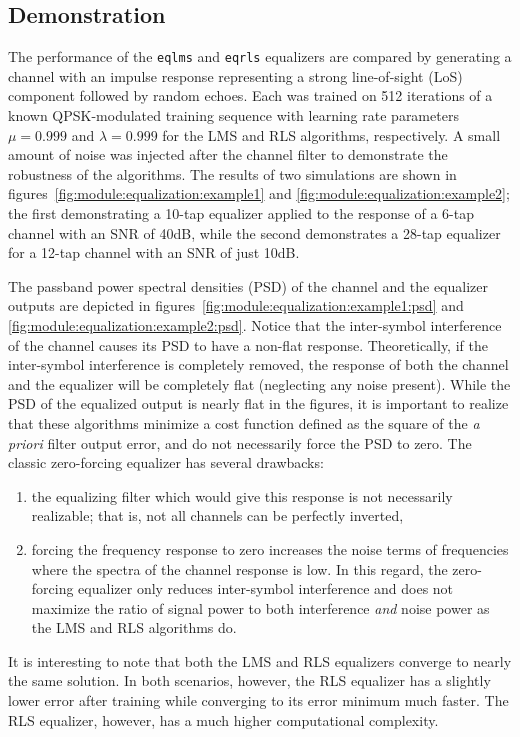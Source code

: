 \subsection{Demonstration}
\label{module:equalization:demo}
The performance of the {\tt eqlms} and {\tt eqrls} equalizers are compared by
generating a channel with an impulse response representing a strong
line-of-sight (LoS) component followed by random echoes.
Each was trained on 512 iterations of a known QPSK-modulated training sequence
with learning rate parameters $\mu=0.999$ and $\lambda=0.999$ for the LMS and
RLS algorithms, respectively.
A small amount of noise was injected after the channel filter to demonstrate
the robustness of the algorithms.
The results of two simulations are shown in
figures~\ref{fig:module:equalization:example1} and
\ref{fig:module:equalization:example2};
the first demonstrating a 10-tap equalizer applied to the response of a 6-tap
channel with an SNR of 40dB, while the second demonstrates a 28-tap equalizer
for a 12-tap channel with an SNR of just 10dB.

The passband power spectral densities (PSD) of the channel and the equalizer
outputs are depicted in figures~\ref{fig:module:equalization:example1:psd} and
\ref{fig:module:equalization:example2:psd}.
Notice that the inter-symbol interference of the channel causes its PSD to
have a non-flat response.
Theoretically, if the inter-symbol interference is completely removed, the
response of both the channel and the equalizer will be completely flat
(neglecting any noise present).
While the PSD of the equalized output is nearly flat in the figures,
it is important to realize that these algorithms minimize a cost function
defined as the square of the {\it a priori} filter output error, and do not
necessarily force the PSD to zero.
The classic zero-forcing equalizer has several drawbacks:
\begin{enumerate}
\item the equalizing filter which would give this response is not
      necessarily realizable; that is, not all channels can be
      perfectly inverted,
\item forcing the frequency response to zero increases the noise
      terms of frequencies where the spectra of the channel
      response is low.  In this regard, the zero-forcing equalizer
      only reduces inter-symbol interference and does not maximize
      the ratio of signal power to both interference {\it and}
      noise power as the LMS and RLS algorithms do.
\end{enumerate}
It is interesting to note that both the LMS and RLS equalizers converge to
nearly the same solution.
In both scenarios, however, the RLS equalizer has a slightly lower error after
training while converging to its error minimum much faster.
The RLS equalizer, however, has a much higher computational complexity.

